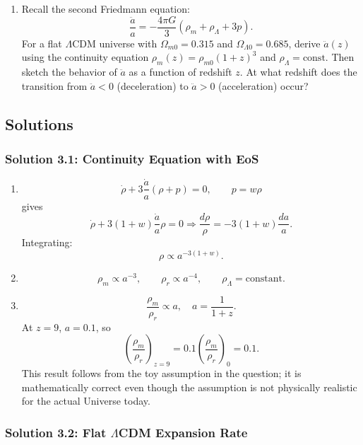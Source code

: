 \begin{enumerate}[label=3.\arabic*]
\begin{enumerate}[label=(\alph*)]
    \item 
    Recall the second Friedmann equation:
    \[
      \frac{\ddot{a}}{a}=-\frac{4\pi G}{3}\left(\rho_m+\rho_\Lambda + 3p\right).
    \]
    For a flat $\Lambda$CDM universe with $\Omega_{m0}=0.315$ and $\Omega_{\Lambda0}=0.685$, derive $\ddot{a}(z)$ using the continuity equation $\rho_m(z)=\rho_{m0}(1+z)^3$ and $\rho_\Lambda=\text{const.}$ Then sketch the behavior of $\ddot{a}$ as a function of redshift $z$. At what redshift does the transition from $\ddot{a}<0$ (deceleration) to $\ddot{a}>0$ (acceleration) occur?
  \end{enumerate}

\end{enumerate}

\bigskip
\bigskip
\bigskip

\subsection{Solutions}

\subsubsection*{Solution 3.1: Continuity Equation with EoS}

\begin{enumerate}[label=(\alph*)]
  \item
  \[
    \dot\rho + 3\frac{\dot a}{a}(\rho+p)=0,
    \qquad p=w\rho
  \]
  gives
  \[
    \dot\rho + 3(1+w)\frac{\dot a}{a}\rho=0
    \Rightarrow \frac{d\rho}{\rho}=-3(1+w)\frac{da}{a}.
  \]
  Integrating:
  \[
    \rho\propto a^{-3(1+w)}.
  \]

  \item
  \[
    \rho_m\propto a^{-3},\qquad
    \rho_r\propto a^{-4},\qquad
    \rho_\Lambda=\text{constant}.
  \]

  \item
  \[
    \frac{\rho_m}{\rho_r}\propto a,
    \quad a=\frac{1}{1+z}.
  \]
  At $z=9$, $a=0.1$, so
  \[
    \left(\frac{\rho_m}{\rho_r}\right)_{z=9}=0.1\left(\frac{\rho_m}{\rho_r}\right)_0=0.1.
  \]
  This result follows from the toy assumption in the question; it is mathematically correct even though the assumption is not physically realistic for the actual Universe today.
\end{enumerate}

\subsubsection*{Solution 3.2: Flat $\Lambda$CDM Expansion Rate}

